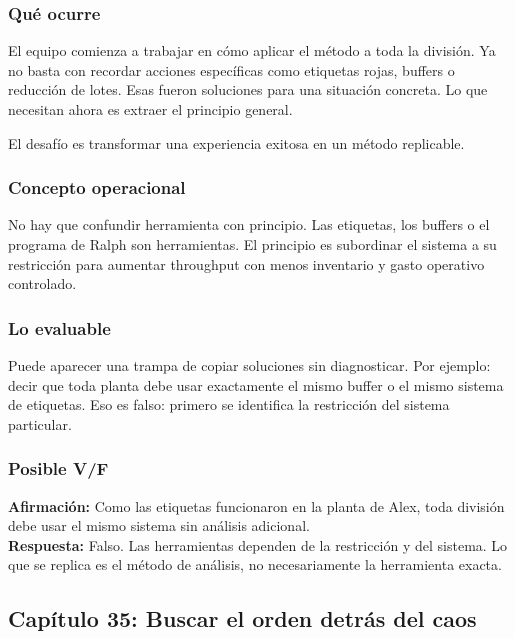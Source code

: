 \documentclass[
  11pt,
]{article}
\begin{document}
\hypertarget{quuxe9-ocurre-7}{%
\subsubsection{Qué ocurre}\label{quuxe9-ocurre-7}}

El equipo comienza a trabajar en cómo aplicar el método a toda la
división. Ya no basta con recordar acciones específicas como etiquetas
rojas, buffers o reducción de lotes. Esas fueron soluciones para una
situación concreta. Lo que necesitan ahora es extraer el principio
general.

El desafío es transformar una experiencia exitosa en un método
replicable.

\hypertarget{concepto-operacional-7}{%
\subsubsection{Concepto operacional}\label{concepto-operacional-7}}

No hay que confundir herramienta con principio. Las etiquetas, los
buffers o el programa de Ralph son herramientas. El principio es
subordinar el sistema a su restricción para aumentar throughput con
menos inventario y gasto operativo controlado.

\hypertarget{lo-evaluable-7}{%
\subsubsection{Lo evaluable}\label{lo-evaluable-7}}

Puede aparecer una trampa de copiar soluciones sin diagnosticar. Por
ejemplo: decir que toda planta debe usar exactamente el mismo buffer o
el mismo sistema de etiquetas. Eso es falso: primero se identifica la
restricción del sistema particular.

\hypertarget{posible-vf-7}{%
\subsubsection{Posible V/F}\label{posible-vf-7}}

\textbf{Afirmación:} Como las etiquetas funcionaron en la planta de
Alex, toda división debe usar el mismo sistema sin análisis adicional.\\
\textbf{Respuesta:} Falso. Las herramientas dependen de la restricción y
del sistema. Lo que se replica es el método de análisis, no
necesariamente la herramienta exacta.

\hypertarget{capuxedtulo-35-buscar-el-orden-detruxe1s-del-caos}{%
\subsection{Capítulo 35: Buscar el orden detrás del
caos}\label{capuxedtulo-35-buscar-el-orden-detruxe1s-del-caos}}
\end{document}
